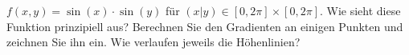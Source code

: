 \item

$f(x,y) = \sin(x) \cdot \sin(y)$
für $(x|y) \in [0, 2\pi] \times  [0, 2\pi]$.
Wie sieht diese Funktion prinzipiell aus?
Berechnen Sie den Gradienten an einigen Punkten
und zeichnen Sie ihn ein.
Wie verlaufen jeweils die Höhenlinien?

